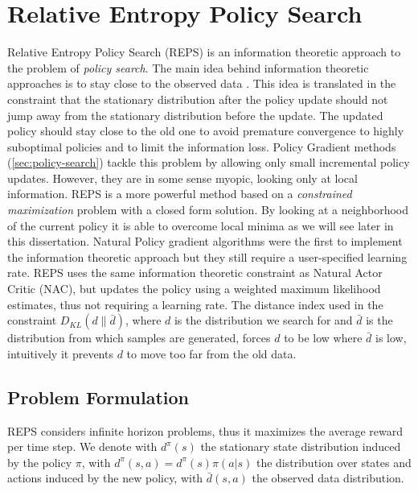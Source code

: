  \clearpage
 
 \section{Relative Entropy Policy Search} \label{sec:reps}
 
 Relative Entropy Policy Search \citep{reps} (REPS) is an information theoretic approach to the problem of \textit{policy search}.
 The main idea behind information theoretic approaches is to stay close to the observed data \citep{deisenroth_survey_2011}. This idea is translated in the constraint that the stationary distribution after the policy update should not jump away from the stationary distribution before the update. The updated policy should stay close to the old one to avoid premature convergence to highly suboptimal policies and to limit the information loss. \newline
 Policy Gradient methods (\cref{sec:policy-search}) tackle this problem by allowing only small incremental policy updates. However, they are in some sense myopic, looking only at local information. REPS is a more powerful method based on a \textit{constrained maximization} problem with a closed form solution. By looking at a neighborhood of the current policy it is able to overcome local minima as we will see later in this dissertation. \newline
 Natural Policy gradient algorithms \citep{kakade_natural_2002} were the first to implement the information theoretic approach but they still require a user-specified learning rate. REPS uses the same information theoretic constraint as Natural Actor Critic \citep{nac} (NAC), but updates the policy using a weighted maximum likelihood estimates, thus not requiring a learning rate.
 The distance index used in the constraint $D_{KL}(d \| \bar{d})$, where $d$ is the distribution we search for and $\bar{d}$ is the distribution from which samples are generated, forces $d$ to be low where $\bar{d}$ is low, intuitively it prevents $d$ to move too far from the old data.
 
 \subsection{Problem Formulation}
 REPS considers infinite horizon problems, thus it maximizes the average reward per time step. 
 We denote with $d^\pi(s)$ the stationary state distribution induced by the policy $\pi$, with $d^\pi(s,a) = d^\pi(s) \pi(a | s)$ the distribution over states and actions induced by the new policy, with $\bar{d}(s,a)$ the observed data distribution. 
